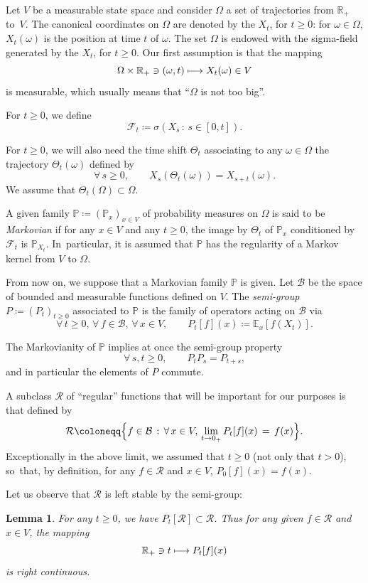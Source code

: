 \documentclass[JEP,XML,SOM,Unicode,NoFloatCountersInSection,published]{cedram}
\newcommand\mto{\mathchoice{\longmapsto}{\mapsto}{\mapsto}{\mapsto}}
\theoremstyle{plain}
\newtheorem{lemma}[thm]{Lemma}
\theoremstyle{definition}
\newcommand{\EE}{{\mathbb E}}
\newcommand{\RR}{{\mathbb R}}
\newcommand{\PP}{{\mathbb P}}
\newcommand\df{\coloneqq}
\newcommand{\bq}{\begin{equation*}}
\newcommand{\eq}{\end{equation*}}
\newcommand{\fo}{\forall\,}
\newcommand{\st}{\,:\,}
\newcommand{\cB}{\mathcal{B}}
\newcommand{\cF}{\mathcal{F}}
\newcommand{\cR}{\mathcal{R}}
\begin{document}
Let $V$ be a measurable state space and consider $\Omega$ a set of trajectories from $\RR_+$ to~$V$.
The canonical coordinates on $\Omega$ are denoted by the $X_t$, for $t\geq 0$: for $\omega\in\Omega$, $X_t(\omega)$ is the position at time $t$ of $\omega$.
The set $\Omega$ is endowed with the sigma-field generated by the $X_t$, for $t\geq 0$.
Our first assumption is that the mapping
\bq
\Omega\times\RR_+\ni(\omega,t)\mto X_t(\omega)\in V\eq
is measurable, which usually means that ``$\Omega$ is not too big''.
\par
For $t\geq 0$, we define \bq
\cF_t\df \sigma( X_s\st s\in[0,t]).\eq
\par
For $t\geq 0$, we will also need the time shift $\Theta_{t}$ associating to any $\omega\in\Omega$ the trajectory $\Theta_{t}(\omega)$ defined by
\bq
\fo s\geq 0,\qquad X_s(\Theta_{t}(\omega))=X_{s+t}(\omega).\eq
We assume that $\Theta_t(\Omega)\subset \Omega$.
\par
A given family $\PP\df (\PP_x)_{x\in V}$ of probability measures on $\Omega$ is said to be \emph{Markovian} if for any $x\in V$ and any $t\geq 0$, the image by $\Theta_t$ of $\PP_x$ conditioned by
$\cF_t$ is $\PP_{X_t}$. In~particular, it is assumed that $\PP$ has the regularity of a Markov kernel from $V$ to $\Omega$.
\par
From now on, we suppose that a Markovian family $\PP$ is given.
Let $\cB$ be the space of bounded and measurable functions defined on $V$.
The \emph{semi-group} $P\df (P_t)_{t\geq 0}$ associated to $\PP$ is the family of operators acting on $\cB$ via
\bq
\fo t\geq 0,\,\fo f\in\cB,\,\fo x\in V,\qquad P_t[f](x)\df \EE_x[f(X_t)].\eq
\par
The Markovianity of $\PP$ implies at once the semi-group property
\bq
\fo s,t\geq 0,\qquad P_tP_s=P_{t+s},
\eq
and in particular the elements of $P$ commute.\par
A subclass $\cR$ of ``regular'' functions that will be important for our purposes is that defined by
\bq
\cR\df \Bigl\{f\in \cB\st \fo x\in V,\, \lim_{t\to 0_+}P_t[f](x)\,=\, f(x)\Bigr\}.\eq
Exceptionally in the above limit, we assumed that $t\geq 0$ (\ie not only that $t>0$), so~that, by definition, for any $f\in\cR$ and $x\in V$,
$P_0[f](x)=f(x)$.\par
Let us observe that $\cR$ is left stable by the semi-group:
\begin{lemma}\label{lem1}
For any $t\geq 0$, we have $P_t[\cR]\subset\cR$. Thus for any given $f\in\cR$ and $x\in V$, the mapping
\bq
\RR_+\ni t\mto P_t[f](x)\eq
is right continuous.
\end{lemma}
\end{document}
